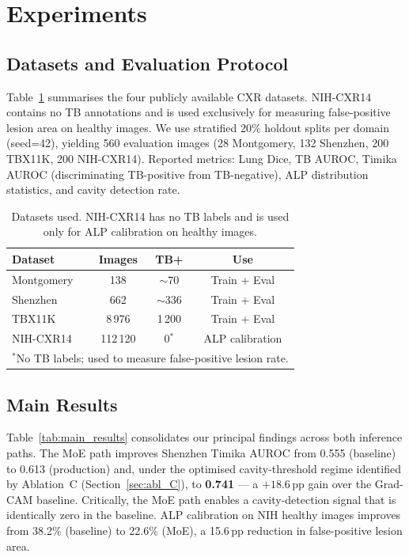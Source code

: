 \documentclass{article}
\begin{document}
\section{Experiments}

\subsection{Datasets and Evaluation Protocol}

Table~\ref{tab:datasets} summarises the four publicly available CXR datasets. NIH-CXR14 contains no TB annotations and is used exclusively for measuring false-positive lesion area on healthy images. We use stratified 20\% holdout splits per domain (seed=42), yielding 560 evaluation images (28 Montgomery, 132 Shenzhen, 200 TBX11K, 200 NIH-CXR14). Reported metrics: Lung Dice, TB AUROC, Timika AUROC (discriminating TB-positive from TB-negative), ALP distribution statistics, and cavity detection rate.

\begin{table}[t]
\caption{Datasets used. NIH-CXR14 has no TB labels and is used only for ALP calibration on healthy images.}
\label{tab:datasets}
\vskip 0.1in
\centering
\small
\begin{tabular}{lccc}
\toprule
Dataset & Images & TB+ & Use \\
\midrule
Montgomery & 138 & $\sim$70 & Train + Eval \\
Shenzhen & 662 & $\sim$336 & Train + Eval \\
TBX11K & 8\,976 & 1\,200 & Train + Eval \\
NIH-CXR14 & 112\,120 & 0$^*$ & ALP calibration \\
\bottomrule
\multicolumn{4}{l}{\footnotesize $^*$No TB labels; used to measure false-positive lesion rate.}
\end{tabular}
\end{table}

\subsection{Main Results}

Table~\ref{tab:main_results} consolidates our principal findings across both inference paths. The MoE path improves Shenzhen Timika AUROC from 0.555 (baseline) to 0.613 (production) and, under the optimised cavity-threshold regime identified by Ablation~C (Section~\ref{sec:abl_C}), to \textbf{0.741} --- a $+18.6$\,pp gain over the Grad-CAM baseline. Critically, the MoE path enables a cavity-detection signal that is identically zero in the baseline. ALP calibration on NIH healthy images improves from 38.2\% (baseline) to 22.6\% (MoE), a 15.6\,pp reduction in false-positive lesion area.
\end{document}
